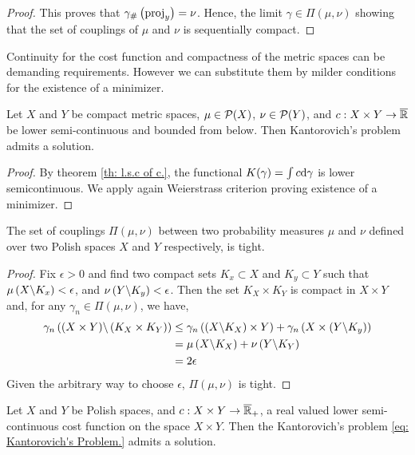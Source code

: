 \begin{theorem}
\begin{proof}
	This proves that ${\gamma}_{\#} \left( \mathrm{proj}_y \right)=\nu$. Hence, the limit $\gamma \in \Pi(\mu, \nu)$ showing that the set of couplings of $\mu$ and $\nu$ is sequentially compact. 
\end{proof}

Continuity for the cost function and compactness of the metric spaces can be demanding requirements. However we can substitute them by milder conditions for the existence of a minimizer. 

\begin{theorem}
	Let $X$ and $Y$ be compact metric spaces, $\mu \in \mathcal{P}(X)$, $\nu \in\mathcal{P}(Y)$, and $c:X\times Y\rightarrow \overline{\mathbb{R}} $  be lower semi-continuous and bounded from below. Then Kantorovich's problem admits a solution.
\end{theorem}

\begin{proof}
By theorem \ref{th: l.s.c of c.}, the functional $K(\gamma) =\int c\mathrm{d}\gamma$ is lower semicontinuous. We apply again Weierstrass criterion proving existence of a minimizer.
\end{proof}


\begin{lemma}
	The set of couplings $\Pi(\mu, \nu)$ between two probability measures $\mu$ and $\nu$ defined over two Polish spaces $X$ and $Y$ respectively, is tight.
\end{lemma}
\begin{proof}
Fix $\epsilon>0$ and find two compact sets $K_x\subset X$ and $K_y\subset Y$ such that $\mu\left( X\backslash K_x \right)<\epsilon$, and $\nu\left( Y\backslash K_y \right)<\epsilon$. Then the set $K_X\times K_Y$ is compact in $X\times Y$ and, for any $\gamma_n\in \Pi(\mu, \nu)$, we have,
\begin{align*}
\gamma_n\left( (X\times Y)\backslash \left( K_X\times K_Y \right) \right)&\leq \gamma_n\left( (X\backslash K_X)\times Y \right)+\gamma_n\left( X\times \left( Y\backslash K_y \right) \right)\\&=\mu\left( X\backslash K_X \right)+\nu\left( Y\backslash K_Y \right)\\&=2\epsilon
\end{align*}  
Given the arbitrary way to choose $\epsilon$, $\Pi(\mu,\nu)$ is tight.
\end{proof}
\begin{theorem}
Let $X$ and $Y$ be Polish spaces, and $c:X\times Y \rightarrow \overline{\mathbb{R}}_+$, a real valued lower semi-continuous cost function on the space $X\times Y$. Then the Kantorovich's problem \eqref{eq: Kantorovich's Problem.} admits a solution.
\end{theorem}


\end{theorem}
